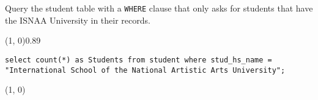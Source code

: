 
Query the student table with a \texttt{WHERE} clause that only asks for students that have the ISNAA University in their records. 
\vspace{\baselineskip}

\sol{}
\noindent\line(1, 0){0.89\linewidth}
\begin{verbatim}
select count(*) as Students from student where stud_hs_name =
"International School of the National Artistic Arts University";
\end{verbatim}
\noindent\line(1, 0){\linewidth}
